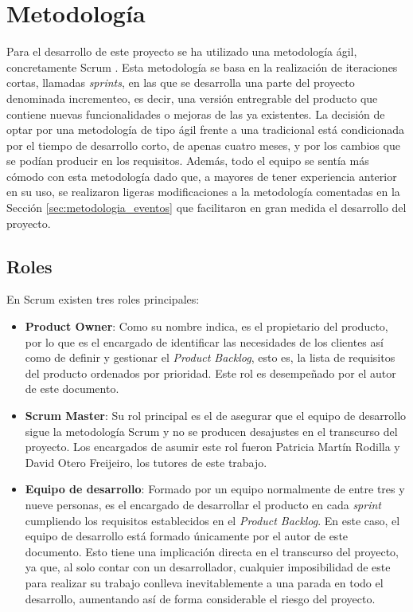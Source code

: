 \chapter{Metodología}
\label{chap:metodologia}

Para el desarrollo de este proyecto se ha utilizado una metodología ágil, concretamente Scrum \cite{scrum}.
Esta metodología se basa en la realización de iteraciones cortas, llamadas \textit{sprints}, en las que se desarrolla una parte del proyecto
denominada incrementeo, es decir, una versión entregrable del producto que contiene
nuevas funcionalidades o mejoras de las ya existentes. La decisión de optar por una metodología de tipo ágil frente a una tradicional
está condicionada por el tiempo de desarrollo corto, de apenas cuatro meses, y por los cambios que se podían producir en los requisitos.
Además, todo el equipo se sentía más cómodo con esta metodología dado que, a mayores de tener experiencia anterior en su uso, se realizaron
ligeras modificaciones a la metodología comentadas en la Sección \ref{sec:metodologia_eventos} que facilitaron en gran medida el desarrollo del
proyecto.

\section{Roles}
\label{sec:metodologia_roles}

En Scrum existen tres roles principales:

\begin{itemize}
		\item \textbf{Product Owner}: Como su nombre indica, es el propietario del producto, por lo que es el encargado de identificar
		las necesidades de los clientes así como de definir y gestionar el \textit{Product Backlog}, esto es, la lista de requisitos del producto ordenados por prioridad.
		Este rol es desempeñado por el autor de este documento.
		\item \textbf{Scrum Master}: Su rol principal es el de asegurar que el equipo de desarrollo sigue la metodología Scrum y no se producen
		desajustes en el transcurso del proyecto. Los encargados de asumir este rol fueron Patricia Martín Rodilla y David Otero Freijeiro, los
		tutores de este trabajo.
		\item \textbf{Equipo de desarrollo}: Formado por un equipo normalmente de entre tres y nueve personas, es el encargado de desarrollar el producto
		en cada \textit{sprint} cumpliendo los requisitos establecidos en el \textit{Product Backlog}. En este caso, el equipo de desarrollo está
		formado únicamente por el autor de este documento. Esto tiene una implicación directa en el transcurso del proyecto, ya que,
		al solo contar con un desarrollador, cualquier imposibilidad de este para realizar su trabajo conlleva inevitablemente a una parada en todo el desarrollo,
		aumentando así de forma considerable el riesgo del proyecto.
\end{itemize}

